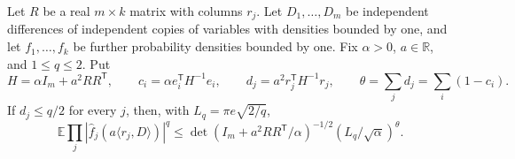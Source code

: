 \begin{lemma}
\label{four:graph}
Let \(R\) be a real \(m\times k\) matrix with columns \(r_j\).
Let \(D_1,\ldots,D_m\) be independent differences of independent
copies of variables with densities bounded by one, and let
\(f_1,\ldots,f_k\) be further probability densities bounded by one.
Fix \(\alpha>0\), \(a\in\mathbb R\), and \(1\leq q\leq2\).  Put
\[
 H=\alpha I_m+a^2RR^{\mathsf T},\qquad
 c_i=\alpha e_i^{\mathsf T}H^{-1}e_i,\qquad
 d_j=a^2r_j^{\mathsf T}H^{-1}r_j,\qquad
 \theta=\sum_jd_j=\sum_i(1-c_i).
\]
If \(d_j\leq q/2\) for every \(j\), then, with
\(L_q=\pi e\sqrt{2/q}\),
\begin{equation}\label{four:graph-bound}
 \mathbb E\prod_j|\widehat f_j(a\langle r_j,D\rangle)|^q
 \leq
 \det(I_m+a^2RR^{\mathsf T}/\alpha)^{-1/2}
          (L_q/\sqrt\alpha)^\theta .
\end{equation}
\end{lemma}
